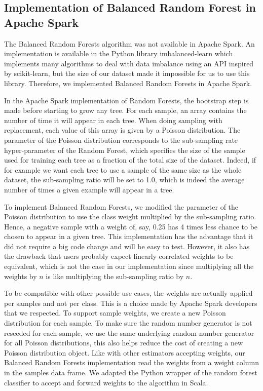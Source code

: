 \documentclass[conference]{IEEEtran}
\begin{document}
\subsection{Implementation of Balanced Random Forest in Apache Spark}

The Balanced Random Forests algorithm was not available in Apache Spark.
An implementation is available in the Python library
imbalanced-learn\cite{imbalance} which implements many algorithms to deal
with data imbalance using an API inspired by scikit-learn, but the size of
our dataset made it impossible for us to use this library. Therefore, we
implemented Balanced Random Forests in Apache Spark.

In the Apache Spark implementation of Random Forests, the bootstrap step is
made before starting to grow any tree. For each sample, an array contains
the number of time it will appear in each tree. When doing sampling with
replacement, each value of this array is given by a Poisson distribution.
The parameter of the Poisson distribution corresponds to the sub-sampling
rate hyper-parameter of the Random Forest, which specifies the size of the
sample used for training each tree as a fraction of the total size of the
dataset. Indeed, if for example we want each tree to use a sample of the
same size as the whole dataset, the sub-sampling ratio will be set to 1.0,
which is indeed the average number of times a given example will appear in a tree.

To implement Balanced Random Forests, we modified the parameter of
the Poisson distribution to use the class weight multiplied by the
sub-sampling ratio. Hence, a negative sample with a weight
of, say, 0.25 has 4 times less chance to be chosen to appear in a given tree. This
implementation has the advantage that it did not require a big code change
and will be easy to test. However, it also has the drawback that users probably
expect linearly correlated weights to be equivalent, which is not the case
in our implementation since multiplying all the weights by $n$ is like multiplying
the sub-sampling ratio by $n$.

To be compatible with other possible use cases, the weights are
actually applied per samples and not per class. This is a choice made by
Apache Spark developers that we respected. To support sample
weights, we create a new Poisson distribution for each sample. To make sure
the random number generator is not reseeded for each sample, we use the
same underlying random number generator for all Poisson distributions, this
also helps reduce the cost of creating a new Poisson distribution object.
Like with other estimators accepting weights, our Balanced Random Forests
implementation read the weights from a weight column in the samples data frame.
We adapted the Python wrapper of the random forest classifier to accept and
forward weights to the algorithm in Scala.
\end{document}
